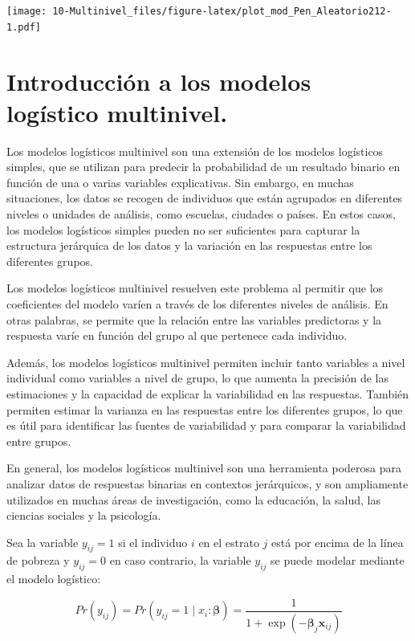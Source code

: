\documentclass[
  12pt,
]{book}
\begin{document}
\texttt{[image: 10-Multinivel\_files/figure-latex/plot\_mod\_Pen\_Aleatorio212-1.pdf]}

\hypertarget{introducciuxf3n-a-los-modelos-loguxedstico-multinivel.}{%
\section{Introducción a los modelos logístico multinivel.}\label{introducciuxf3n-a-los-modelos-loguxedstico-multinivel.}}

Los modelos logísticos multinivel son una extensión de los modelos logísticos simples, que se utilizan para predecir la probabilidad de un resultado binario en función de una o varias variables explicativas. Sin embargo, en muchas situaciones, los datos se recogen de individuos que están agrupados en diferentes niveles o unidades de análisis, como escuelas, ciudades o países. En estos casos, los modelos logísticos simples pueden no ser suficientes para capturar la estructura jerárquica de los datos y la variación en las respuestas entre los diferentes grupos.

Los modelos logísticos multinivel resuelven este problema al permitir que los coeficientes del modelo varíen a través de los diferentes niveles de análisis. En otras palabras, se permite que la relación entre las variables predictoras y la respuesta varíe en función del grupo al que pertenece cada individuo.

Además, los modelos logísticos multinivel permiten incluir tanto variables a nivel individual como variables a nivel de grupo, lo que aumenta la precisión de las estimaciones y la capacidad de explicar la variabilidad en las respuestas. También permiten estimar la varianza en las respuestas entre los diferentes grupos, lo que es útil para identificar las fuentes de variabilidad y para comparar la variabilidad entre grupos.

En general, los modelos logísticos multinivel son una herramienta poderosa para analizar datos de respuestas binarias en contextos jerárquicos, y son ampliamente utilizados en muchas áreas de investigación, como la educación, la salud, las ciencias sociales y la psicología.

Sea la variable \(y_{ij} = 1\) si el individuo \(i\) en el estrato \(j\) está por encima de la línea de pobreza y \(y_{ij} = 0\) en caso contrario, la variable \(y_{ij}\) se puede modelar mediante el modelo logístico:

\[
Pr\left(y_{ij}\right)=Pr\left(y_{ij}=1\mid x_{i}:\boldsymbol{\beta}\right)=\frac{1}{1+\exp\left(\boldsymbol{-\beta}_{j}\boldsymbol{x}_{ij}\right)}
\]
\end{document}
